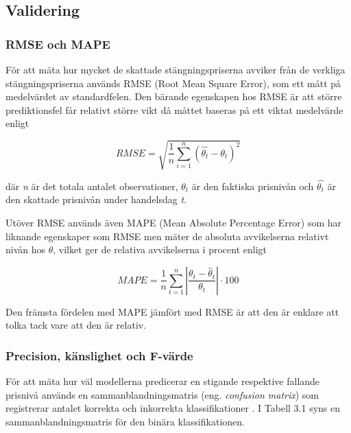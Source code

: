 \documentclass[11pt]{article}
\numberwithin{equation}{section}
\numberwithin{table}{section}
\numberwithin{figure}{section}
\begin{document}
\subsection{Validering}
\subsubsection{RMSE och MAPE}
För att mäta hur mycket de skattade stängningspriserna avviker från de verkliga stängningspriserna används RMSE (Root Mean Square Error), som ett mått på medelvärdet av standardfelen. Den bärande egenskapen hos RMSE är att större prediktionsfel får relativt större vikt då måttet baseras på ett viktat medelvärde enligt

\begin{equation}
RMSE = \sqrt{\frac{1}{n}\sum_{i=1}^{n}   (\hat{\theta_{t}} - \theta_{t})^2}
\end{equation}

där \emph{n} är det totala antalet observationer, $\theta_{t}$ är den faktiska prisnivån och $\hat{\theta_{t}}$ är den skattade prisnivån under handelsdag \emph{t}. 

Utöver RMSE används även MAPE (Mean Absolute Percentage Error) som har liknande egenskaper som RMSE men mäter de absoluta avvikelserna relativt nivån hos $\theta$, vilket ger de relativa avvikelserna i procent enligt

\begin{equation}
    \textit{MAPE}=\frac{1}{n} 
    \sum_{t=1}^{n} \left| \frac{\theta_{t}-\hat{\theta}_{t}}{\theta_{t}} \right| \cdot 100
\end{equation}

Den främsta fördelen med MAPE jämfört med RMSE är att den är enklare att tolka tack vare att den är relativ. 




\subsubsection{Precision, känslighet och F-värde}
För att mäta hur väl modellerna predicerar en stigande respektive fallande prisnivå används en sammanblandningsmatris (eng. \textit{confusion matrix}) som registrerar antalet korrekta och inkorrekta klassifikationer \parencite{ModelValidation}. I Tabell 3.1 syns en sammanblandningsmatris för den binära klassifikationen.
\end{document}
